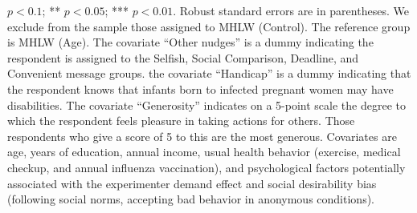 \documentclass[
    a4paper
]{article}
\begin{document}
\begin{table}
\begin{threeparttable}
\begin{tablenotes}
\item * $p < 0.1$; ** $p < 0.05$; *** $p < 0.01$. Robust standard errors are in parentheses. We exclude from the sample those assigned to MHLW (Control). The reference group is MHLW (Age). The covariate ``Other nudges'' is a dummy indicating the respondent is assigned to the Selfish, Social Comparison, Deadline, and Convenient message groups. the covariate ``Handicap'' is a dummy indicating that the respondent knows that infants born to infected pregnant women may have disabilities. The covariate ``Generosity'' indicates on a 5-point scale the degree to which the respondent feels pleasure in taking actions for others. Those respondents who give a score of 5 to this are the most generous. Covariates are age, years of education, annual income, usual health behavior (exercise, medical checkup, and annual influenza vaccination), and psychological factors potentially associated with the experimenter demand effect and social desirability bias (following social norms, accepting bad behavior in anonymous conditions).
\end{tablenotes}
\end{threeparttable}
\end{table}
\end{document}
